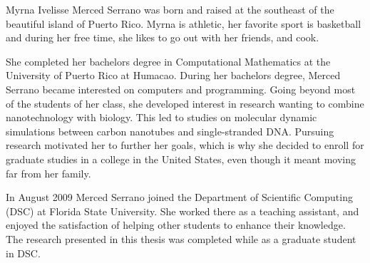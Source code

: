 \documentclass[11pt]{fsuthesis}
\begin{document}
\begin{biosketch}
Myrna Ivelisse Merced Serrano was born and raised at the southeast of the beautiful island of Puerto Rico. Myrna is athletic, her favorite sport is basketball and during her free time, she likes to go out with her friends, and cook. 

She completed her bachelors degree in Computational Mathematics at the University of Puerto Rico at Humacao. During her bachelors degree, Merced Serrano became interested on computers and programming. Going beyond most of the students of her class, she developed interest in research wanting to combine nanotechnology with biology. This led to studies on molecular dynamic simulations between carbon nanotubes and single-stranded DNA. Pursuing research motivated her to further her goals, which is why she decided to enroll for graduate studies in a college in the United States, even though it meant moving far from her family.

In August 2009 Merced Serrano joined the Department of Scientific Computing (DSC) at Florida State University. She worked there as a teaching assistant, and enjoyed the satisfaction of helping other students to enhance their knowledge. The research presented in this thesis was completed while as a graduate student in DSC.
\end{biosketch}
\end{document}

